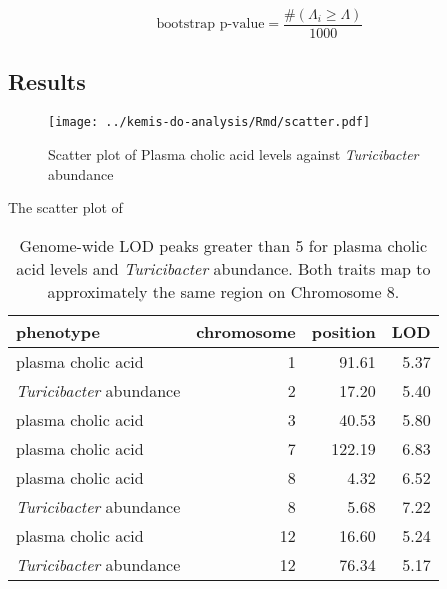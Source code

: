 \documentclass[oneside]{book}
\begin{document}
\begin{equation}
\text{bootstrap p-value} = \frac{\#(\Lambda_i \geq \Lambda)}{1000}
\label{eq:bootp}
\end{equation}



\subsection{Results}


\begin{figure}
\texttt{[image: ../kemis-do-analysis/Rmd/scatter.pdf]}
\caption{Scatter plot of Plasma cholic acid levels against \emph{Turicibacter} abundance}
\end{figure}

The scatter plot of 


\begin{table}[ht]
\centering
\begin{tabular}{lrrr}
  \hline
phenotype & chromosome & position & LOD \\ 
  \hline
plasma cholic acid &   1 & 91.61 & 5.37 \\ 
 \emph{Turicibacter} abundance &   2 & 17.20 & 5.40 \\ 
  plasma cholic acid &   3 & 40.53 & 5.80 \\ 
  plasma cholic acid &   7 & 122.19 & 6.83 \\ 
  plasma cholic acid &   8 & 4.32 & 6.52 \\ 
 \emph{Turicibacter} abundance &   8 & 5.68 & 7.22 \\ 
  plasma cholic acid &  12 & 16.60 & 5.24 \\ 
 \emph{Turicibacter} abundance &  12 & 76.34 & 5.17 \\ 
   \hline
\end{tabular}
\caption{\label{tab:3c-lod-peaks}Genome-wide LOD peaks greater than 5 for plasma cholic acid levels and \emph{Turicibacter} abundance. Both traits map to approximately the same region on Chromosome 8.}
\end{table}
\end{document}
